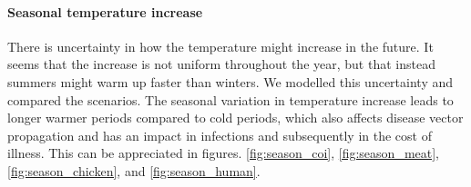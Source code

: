 \paragraph{Seasonal temperature increase}

There is uncertainty in how the temperature might increase in the future. It seems that the increase is not uniform throughout the year, but that instead summers might warm up faster than winters. We modelled this uncertainty and compared the scenarios. The seasonal variation in temperature increase leads to longer warmer periods compared to cold periods, which also affects disease vector propagation and has an impact in infections and subsequently in the cost of illness. This can be appreciated in figures. \ref{fig:season_coi}, \ref{fig:season_meat}, \ref{fig:season_chicken}, and \ref{fig:season_human}.

